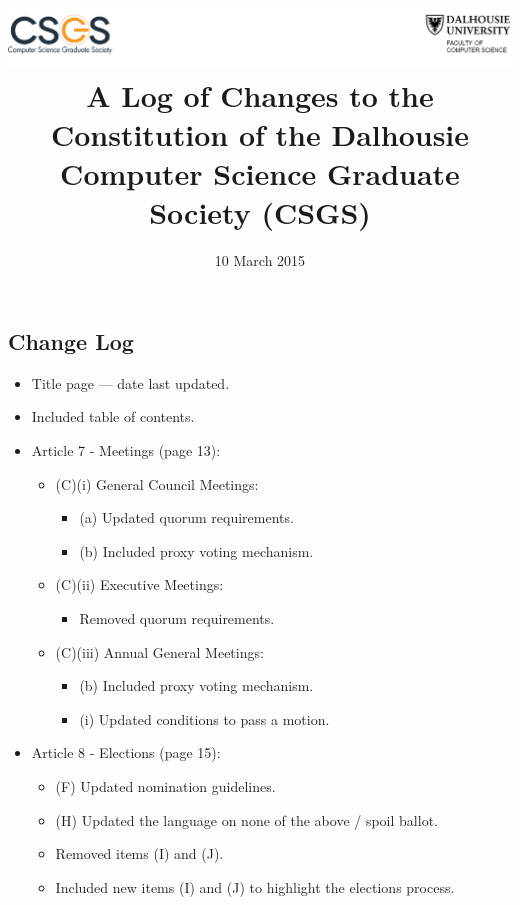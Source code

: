 \documentclass[]{report}
\title{
	\includegraphics[width=1.00\columnwidth]{header}\\
	\vspace{3.0 in}
	A Log of Changes to the Constitution of the Dalhousie Computer Science Graduate Society (CSGS)
}
\author{ }
\date{10 March 2015}
\begin{document}
\maketitle

\clearpage
\begin{center}
	\section*{Change Log}
	\vspace{12px}
\end{center}
\label{preamble}
	
	\begin{itemize}
	
		\item Title page --- date last updated.
		
		\item Included table of contents.
		
		\item Article 7 - Meetings (page 13):
		\begin{itemize}
			\item (C)(i) General Council Meetings:
			\begin{itemize}
				\item (a) Updated quorum requirements.
				\item (b) Included proxy voting mechanism.
			\end{itemize}
			
			\item (C)(ii) Executive Meetings:
			\begin{itemize}
				\item Removed quorum requirements.
			\end{itemize}
			
			\item (C)(iii) Annual General Meetings:
			\begin{itemize}
				\item (b) Included proxy voting mechanism.
				\item (i) Updated conditions to pass a motion.
			\end{itemize}
		\end{itemize}
		
		\item Article 8 - Elections (page 15):
		\begin{itemize}
			\item (F) Updated nomination guidelines.
			\item (H) Updated the language on none of the above / spoil ballot.
			\item Removed items (I) and (J).
			\item Included new items (I) and (J) to highlight the elections process.
		\end{itemize}
		

\end{itemize}
\end{document}
